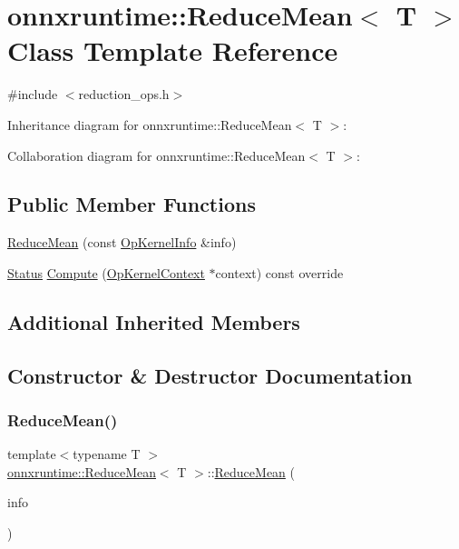 \hypertarget{classonnxruntime_1_1ReduceMean}{}\section{onnxruntime\+:\+:Reduce\+Mean$<$ T $>$ Class Template Reference}
\label{classonnxruntime_1_1ReduceMean}


{\ttfamily \#include $<$reduction\+\_\+ops.\+h$>$}



Inheritance diagram for onnxruntime\+:\+:Reduce\+Mean$<$ T $>$\+:


Collaboration diagram for onnxruntime\+:\+:Reduce\+Mean$<$ T $>$\+:
\subsection*{Public Member Functions}
\begin{DoxyCompactItemize}
\item 
\mbox{\hyperlink{classonnxruntime_1_1ReduceMean_a8628705c547e2296ac85028df2b5ed78}{Reduce\+Mean}} (const \mbox{\hyperlink{classonnxruntime_1_1OpKernelInfo}{Op\+Kernel\+Info}} \&info)
\item 
\mbox{\hyperlink{classonnxruntime_1_1common_1_1Status}{Status}} \mbox{\hyperlink{classonnxruntime_1_1ReduceMean_a5c9330e5da41f3b6fa14fc3c43ca6b50}{Compute}} (\mbox{\hyperlink{classonnxruntime_1_1OpKernelContext}{Op\+Kernel\+Context}} $\ast$context) const override
\end{DoxyCompactItemize}
\subsection*{Additional Inherited Members}


\subsection{Constructor \& Destructor Documentation}
\mbox{\label{classonnxruntime_1_1ReduceMean_a8628705c547e2296ac85028df2b5ed78}} 
\subsubsection{\texorpdfstring{Reduce\+Mean()}{ReduceMean()}}
{\footnotesize\ttfamily template$<$typename T $>$ \\
\mbox{\hyperlink{classonnxruntime_1_1ReduceMean}{onnxruntime\+::\+Reduce\+Mean}}$<$ T $>$\+::\mbox{\hyperlink{classonnxruntime_1_1ReduceMean}{Reduce\+Mean}} (\begin{DoxyParamCaption}\item[{const \mbox{\hyperlink{classonnxruntime_1_1OpKernelInfo}{Op\+Kernel\+Info}} \&}]{info }\end{DoxyParamCaption})\hspace{0.3cm}{\ttfamily [inline]}}



